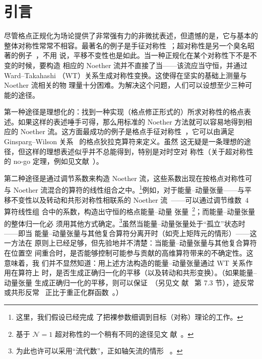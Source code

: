 \section{引言}
\label{sec:1}
尽管格点正规化为场论提供了非常强有力的非微扰表述，但遗憾的是，它与基本的
整体对称性常常不相容。最著名的例子是手征对称性~\cite{Nielsen:1980rz,%
Nielsen:1981xu}；超对称性是另一个臭名昭著的例子~\cite{Dondi:1976tx}，不用
说，平移不变性也是如此。当一种正规化在某个对称性下不是不变的时候，要构造
相应的 Noether 流并不直接了当——该流应当守恒，并通过 Ward--Takahashi
（WT）关系生成对称性变换。这使得在坚实的基础上测量与 Noether 流相关的物
理量十分困难。为解决这个问题，人们可以设想至少三种可能的途径。

第一种途径是理想化的：找到一种实现（格点修正形式的）所求对称性的格点表
述。如果这样的表述唾手可得，那么用标准的 Noether 方法就可以容易地得到相
应的 Noether 流。这方面最成功的例子是格点手征对称性~\cite{Kaplan:1992bt,%
Neuberger:1997fp,Hasenfratz:1997ft,Hasenfratz:1998ri,Neuberger:1998wv,%
Hasenfratz:1998jp,Luscher:1998pqa,Niedermayer:1998bi}，它可以由满足
Ginsparg--Wilson 关系~\cite{Ginsparg:1981bj} 的格点狄拉克算符来定义。虽然
这无疑是一条理想的途径，但这样的理想表述似乎并不总能得到，特别是对时空对
称性（关于超对称性的 no-go 定理，例如见文献~\cite{Kato:2008sp}）。

第二种途径是通过调节系数来构造 Noether 流，这些系数出现在按格点对称性可
与 Noether 流混合的算符的线性组合之中。\footnote{这里，我们假设已经完成
了把裸参数细调到目标（对称）理论的工作。}例如，对于能量--动量张量——与平
移不变性以及转动和共形对称性相联系的 Noether
流~\cite{Callan:1970ze,Coleman:1970je}——可以通过调节维数~$4$ 算符线性组
合中的系数，构造出守恒的格点能量--动量
张量~\cite{Caracciolo:1988hc,Caracciolo:1989pt}\footnote{基于
$\mathcal{N}=1$ 超对称性的一个稍有不同的途径见文
献~\cite{Suzuki:2013gi,Suzuki:2012wx}。}；而能量--动量张量的整体归一化必
须用其他方式确定。\footnote{为此也许可以采用“流代数”，正如轴矢流的情形
~\cite{Bochicchio:1985xa}。}虽然当能量--动量张量处于“孤立”状态时——即当
能量--动量张量与其他复合算符分离开时（如壳上矩阵元的情形）——这一方法在
原则上已经足够，但先验地并不清楚：当能量--动量张量与其他复合算符在位置空
间重合时，是否能够控制可能参与贡献的高维算符带来的不确定性。这意味着，我
们并不显然知道：用上述方法构造的能量--动量张量通过 WT 关系作用在算符上
时，是否生成正确归一化的平移（以及转动和共形变换）。（如果能量--动量张量
生成正确归一化的平移，则可以保证~\cite{Fujikawa:1980rc}（另见文
献~\cite{Fujikawa:2004cx} 第 7.3 节），迹反常或共形反常~\cite{Crewther:1972kn,%
Chanowitz:1972vd} 正比于重正化群函数~\cite{Adler:1976zt,Nielsen:1977sy,%
Collins:1976yq}。）


